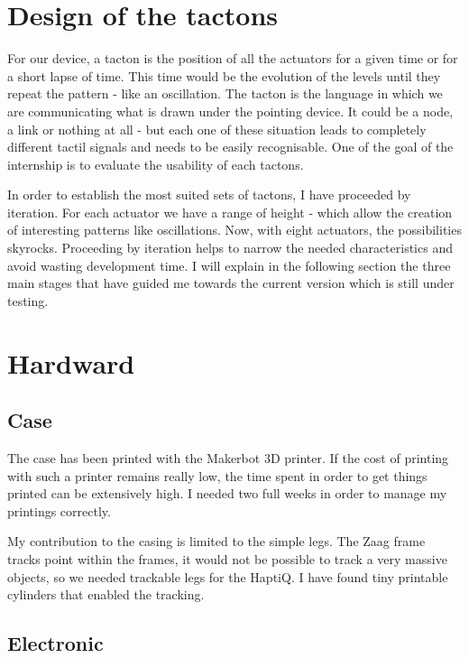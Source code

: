 \section{Design of the tactons}\label{design-of-the-tactons}

For our device, a tacton is the position of all the actuators for a
given time or for a short lapse of time. This time would be the
evolution of the levels until they repeat the pattern - like an
oscillation. The tacton is the language in which we are communicating
what is drawn under the pointing device. It could be a node, a link or
nothing at all - but each one of these situation leads to completely
different tactil signals and needs to be easily recognisable. One of the
goal of the internship is to evaluate the usability of each tactons.

In order to establish the most suited sets of tactons, I have proceeded
by iteration. For each actuator we have a range of height - which allow
the creation of interesting patterns like oscillations. Now, with eight
actuators, the possibilities skyrocks. Proceeding by iteration helps to
narrow the needed characteristics and avoid wasting development time. I
will explain in the following section the three main stages that have
guided me towards the current version which is still under testing.

\section{Hardward}\label{hardward}

\subsection{Case}

The case has been printed with the Makerbot 3D printer. If the cost of printing with such a printer remains really low, the time spent in order to get things printed can be extensively high. I needed two full weeks in order to manage my printings correctly.

My contribution to the casing is limited to the simple legs. The Zaag frame tracks point within the frames, it would not be possible to track a very massive objects, so we needed trackable legs for the HaptiQ. I have found tiny printable cylinders that enabled the tracking.

\subsection{Electronic}

